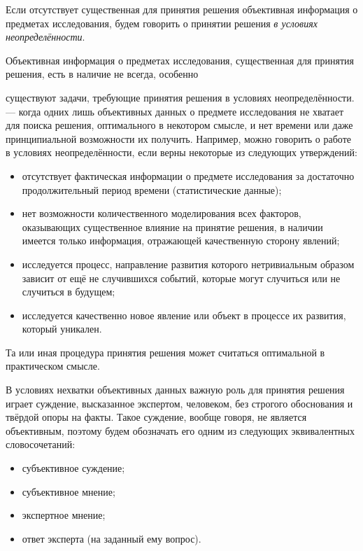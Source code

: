 Если отсутствует существенная для принятия решения объективная информация о предметах исследования, будем говорить о принятии решения {\sl в условиях неопределённости}. 

Объективная информация о предметах исследования, существенная для принятия решения, есть в наличие не всегда, особенно

существуют задачи, требующие принятия решения в условиях неопределённости.
--- когда одних лишь объективных данных о предмете исследования не хватает для поиска решения, оптимального в некотором смысле, и нет времени или даже принципиальной возможности их  получить. Например, можно говорить о работе в условиях неопределённости, если верны некоторые из следующих утверждений:
\begin{itemize}
 \item отсутствует фактическая информации о предмете исследования за достаточно продолжительный период времени (статистические данные);
 \item нет возможности количественного моделирования всех факторов, оказывающих существенное влияние на принятие решения, в наличии имеется только информация, отражающей качественную сторону явлений; 
 \item исследуется процесс, направление развития которого нетривиальным образом зависит от ещё не случившихся событий, которые могут случиться или не случиться в будущем;
 \item исследуется качественно новое явление или объект в процессе их развития, который уникален.
\end{itemize}

Та или иная процедура принятия решения может считаться оптимальной в практическом смысле. 

В условиях нехватки объективных данных важную роль для принятия решения играет суждение, высказанное экспертом, человеком, без строгого обоснования и твёрдой опоры на факты. Такое суждение, вообще говоря, не является объективным, поэтому будем обозначать его одним из следующих эквивалентных словосочетаний:
 \begin{itemize}
	\item субъективное суждение;
	\item субъективное мнение;
	\item экспертное мнение;
	\item ответ эксперта (на заданный ему вопрос). 
 \end{itemize}

